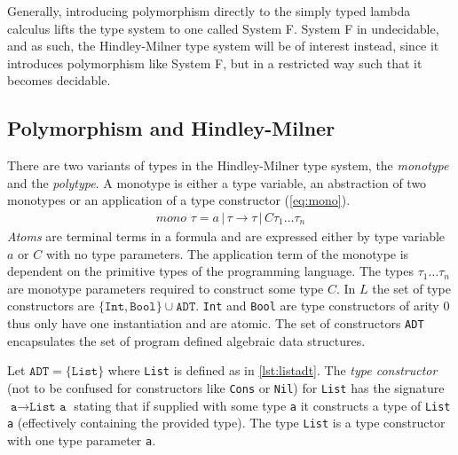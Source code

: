 Generally, introducing polymorphism directly to the simply typed lambda calculus lifts the type system to one called System F.
System F in undecidable, and as such, the Hindley-Milner type system will be of interest instead, since it introduces polymorphism like System F, but in a restricted way such that it becomes decidable.


\subsection{Polymorphism and Hindley-Milner}
There are two variants of types in the Hindley-Milner type system, the \textit{monotype} and the \textit{polytype}.
A monotype is either a type variable, an abstraction of two monotypes or an application of a type constructor (\autoref{eq:mono}).
\begin{align}
	mono \,\,\tau = a \,|\, \tau \rightarrow \tau \,|\, C \tau_1 \dots \tau_n
	\label{eq:mono}
\end{align}
\textit{Atoms} are terminal terms in a formula and are expressed either by type variable $a$ or $C$ with no type parameters.
The application term of the monotype is dependent on the primitive types of the programming language.
The types $\tau_1 \dots \tau_n$ are monotype parameters required to construct some type $C$.
In $L$ the set of type constructors are $\{ \texttt{Int}, \texttt{Bool} \} \cup \texttt{ADT}$.
\texttt{Int} and \texttt{Bool} are type constructors of arity 0 thus only have one instantiation and are atomic.
The set of constructors \texttt{ADT} encapsulates the set of program defined algebraic data structures.
\begin{exmp}
    Let $\texttt{ADT} = \{ \texttt{List} \}$ where \texttt{List} is defined as in \autoref{lst:listadt}.
    The \textit{type constructor} (not to be confused for constructors like \texttt{Cons} or \texttt{Nil}) for \texttt{List} has the signature $\texttt{a} \rightarrow \texttt{List a}$ stating that if supplied with some type \texttt{a} it constructs a type of \texttt{List a} (effectively containing the provided type).
    The type \texttt{List} is a type constructor with one type parameter \texttt{a}.
\end{exmp}

